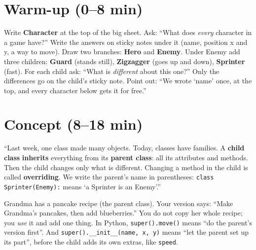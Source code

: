\section{Warm-up (0--8 min)}
\begin{unplugged}
Write \textbf{Character} at the top of the big sheet. Ask: \enquote{What does \emph{every} character in a game have?} Write the answers on sticky notes under it (name, position x and y, a way to move). Draw two branches: \textbf{Hero} and \textbf{Enemy}. Under Enemy add three children: \textbf{Guard} (stands still), \textbf{Zigzagger} (goes up and down), \textbf{Sprinter} (fast). For each child ask: \enquote{What is \emph{different} about this one?} Only the differences go on the child's sticky note.
Point out: \enquote{We wrote \enquote{name} once, at the top, and every character below gets it for free.}
\end{unplugged}

\section{Concept (8--18 min)}
\begin{teacherscript}
\enquote{Last week, one class made many objects. Today, classes have families. A \textbf{child class} \textbf{inherits} everything from its \textbf{parent class}: all its attributes and methods. Then the child changes only what is different. Changing a method in the child is called \textbf{overriding}. We write the parent's name in parentheses: \texttt{class Sprinter(Enemy):} means \enquote{a Sprinter is an Enemy}.}
\end{teacherscript}

\begin{analogy}
Grandma has a pancake recipe (the parent class). Your version says: \enquote{Make Grandma's pancakes, then add blueberries.} You do not copy her whole recipe; you \emph{use} it and add one thing. In Python, \texttt{super().move()} means \enquote{do the parent's version first}. And \texttt{super().\_\_init\_\_(name, x, y)} means \enquote{let the parent set up its part}, before the child adds its own extras, like \texttt{speed}.
\end{analogy}


